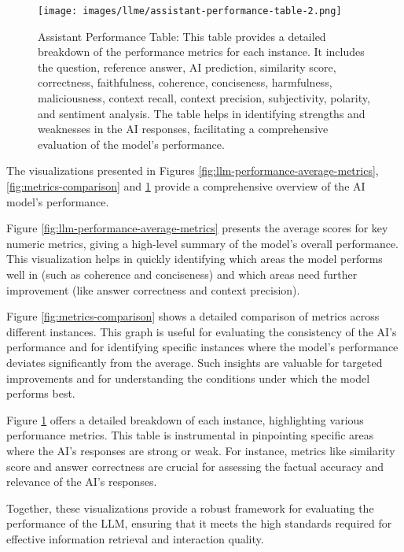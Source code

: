\begin{figure}[h!]
    \centering
    \texttt{[image: images/llme/assistant-performance-table-2.png]}
    \caption{Assistant Performance Table: This table provides a detailed breakdown of the performance metrics for each instance. It includes the question, reference answer, AI prediction, similarity score, correctness, faithfulness, coherence, conciseness, harmfulness, maliciousness, context recall, context precision, subjectivity, polarity, and sentiment analysis. The table helps in identifying strengths and weaknesses in the AI responses, facilitating a comprehensive evaluation of the model's performance.}
    \label{fig:assistant-performance-table}
\end{figure}

The visualizations presented in Figures \ref{fig:llm-performance-average-metrics}, \ref{fig:metrics-comparison} and \ref{fig:assistant-performance-table} provide a comprehensive overview of the AI model's performance.

Figure \ref{fig:llm-performance-average-metrics} presents the average scores for key numeric metrics, giving a high-level summary of the model's overall performance. This visualization helps in quickly identifying which areas the model performs well in (such as coherence and conciseness) and which areas need further improvement (like answer correctness and context precision).

Figure \ref{fig:metrics-comparison} shows a detailed comparison of metrics across different instances. This graph is useful for evaluating the consistency of the AI's performance and for identifying specific instances where the model's performance deviates significantly from the average. Such insights are valuable for targeted improvements and for understanding the conditions under which the model performs best.

Figure \ref{fig:assistant-performance-table} offers a detailed breakdown of each instance, highlighting various performance metrics. This table is instrumental in pinpointing specific areas where the AI's responses are strong or weak. For instance, metrics like similarity score and answer correctness are crucial for assessing the factual accuracy and relevance of the AI's responses.

Together, these visualizations provide a robust framework for evaluating the performance of the LLM, ensuring that it meets the high standards required for effective information retrieval and interaction quality.

